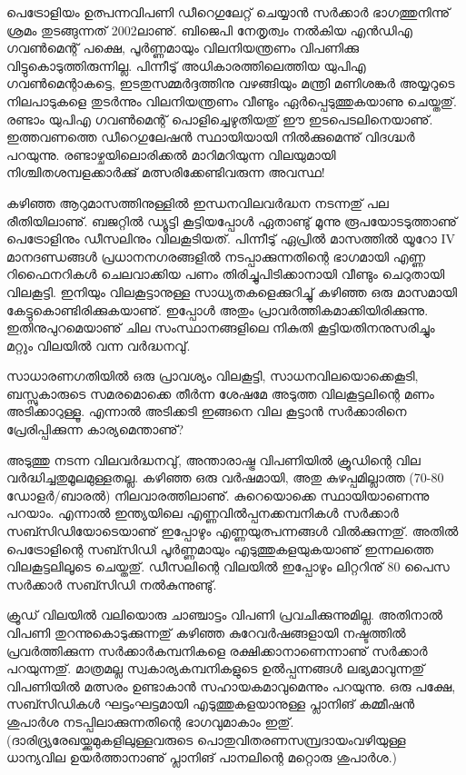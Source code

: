 ﻿
\vskip 2pt

\hspace*{2em}\parbox{8.5cm}{
\small
പെട്രോളിയം ഉത്പന്നവിപണി ഡീറെഗുലേറ്റ് ചെയ്യാന്‍ സര്‍ക്കാര്‍ ഭാഗത്തുനിന്നു് ശ്രമം തുടങ്ങുന്നത് 2002ലാണു്. 
ബിജെപി നേതൃത്വം നല്‍കിയ എന്‍ഡിഎ ഗവണ്‍മെന്റ് പക്ഷെ, പൂര്‍ണ്ണമായും വിലനിയന്ത്രണം വിപണിക്കു 
വിട്ടുകൊടുത്തിരുന്നില്ല. പിന്നീടു് അധികാരത്തിലെത്തിയ യുപിഎ ഗവണ്‍മെന്റാകട്ടെ, ഇടതുസമ്മര്‍ദ്ദത്തിനു വഴങ്ങിയും 
മന്ത്രി മണിശങ്കര്‍ അയ്യറുടെ നിലപാടുകളെ തുടര്‍ന്നും വിലനിയന്ത്രണം വീണ്ടും ഏര്‍പ്പെടുത്തുകയാണു ചെയ്തതു്. രണ്ടാം 
യുപിഎ ഗവണ്‍മെന്റ് പൊളിച്ചെഴുതിയതു് ഈ ഇടപെടലിനെയാണു്. ഇത്തവണത്തെ ഡീറെഗുലേഷന്‍ സ്ഥായിയായി
നില്‍ക്കുമെന്നു് വിദഗ്ദ്ധര്‍ പറയുന്നു. രണ്ടാഴ്ചയിലൊരിക്കല്‍ മാറിമറിയുന്ന വിലയുമായി നിശ്ചിതശമ്പളക്കാര്‍ക്കു് 
മത്സരിക്കേണ്ടിവരുന്ന അവസ്ഥ!
}

{\vskip 14pt}
\hspace*{-1.5em}കഴിഞ്ഞ ആറുമാസത്തിനുള്ളില്‍ ഇന്ധനവിലവര്‍ദ്ധന നടന്നതു് പല രീതിയിലാണു്. ബജറ്റില്‍ ഡ്യൂട്ടി കൂട്ടിയപ്പോള്‍ 
ഏതാണ്ടു് മൂന്നു രൂപയോടടുത്താണു് പെട്രോളിനും ഡീസലിനും വിലകൂടിയത്. പിന്നീടു് ഏപ്രില്‍ മാസത്തില്‍ യൂറോ IV 
മാനദണ്ഡങ്ങള്‍ പ്രധാനനഗരങ്ങളില്‍ നടപ്പാക്കുന്നതിന്റെ ഭാഗമായി എണ്ണ റിഫൈനറികള്‍ ചെലവാക്കിയ പണം 
തിരിച്ചുപിടിക്കാനായി വീണ്ടും ചെറുതായി വിലകൂട്ടി. ഇനിയും വിലകൂട്ടാനുള്ള സാധ്യതകളെക്കുറിച്ചു് കഴിഞ്ഞ ഒരു മാസമായി
കേട്ടുകൊണ്ടിരിക്കുകയാണു്. ഇപ്പോള്‍ അതും പ്രാവര്‍ത്തികമാക്കിയിരിക്കുന്നു. ഇതിനുപുറമെയാണു് ചില സംസ്ഥാനങ്ങളിലെ
നികുതി കൂട്ടിയതിനനുസരിച്ചും മറ്റും വിലയില്‍ വന്ന വര്‍ദ്ധനവു്.

സാധാരണഗതിയില്‍ ഒരു പ്രാവശ്യം വിലകൂട്ടി, സാധനവിലയൊക്കെകൂടി, ബസ്സുകാരുടെ സമരമൊക്കെ തീര്‍ന്ന 
ശേഷമേ അടുത്ത വിലകൂട്ടലിന്റെ മണം അടിക്കാറുള്ളൂ. എന്നാല്‍ അടിക്കടി ഇങ്ങനെ വില കൂട്ടാന്‍ സര്‍ക്കാരിനെ 
പ്രേരിപ്പിക്കുന്ന കാര്യമെന്താണു്?

അടുത്തു നടന്ന വിലവര്‍ദ്ധനവു്, അന്താരാഷ്ട്ര വിപണിയില്‍ ക്രൂഡിന്റെ വില വര്‍ദ്ധിച്ചതുമൂലമുള്ളതല്ല. കഴിഞ്ഞ ഒരു 
വര്‍ഷമായി, അതു കുഴപ്പമില്ലാത്ത (70-80 ഡോളര്‍/ബാരല്‍) നിലവാരത്തിലാണു്. കുറെയൊക്കെ സ്ഥായിയാണെന്നു
പറയാം. എന്നാല്‍ ഇന്ത്യയിലെ എണ്ണവില്‍പ്പനക്കമ്പനികള്‍ സര്‍ക്കാര്‍ സബ്സിഡിയോടെയാണു് ഇപ്പോഴും 
എണ്ണയുത്പന്നങ്ങള്‍ വില്‍ക്കുന്നതു്. അതില്‍ പെട്രോളിന്റെ സബ്സിഡി പൂര്‍ണ്ണമായും എടുത്തുകളയുകയാണു് 
ഇന്നലത്തെ വിലകൂട്ടലിലൂടെ ചെയ്തതു്. ഡീസലിന്റെ വിലയില്‍ ഇപ്പോഴും ലിറ്ററിനു് 80 പൈസ സര്‍ക്കാര്‍ 
സബ്സിഡി നല്‍കുന്നുണ്ടു്.

ക്രൂഡ് വിലയില്‍ വലിയൊരു ചാഞ്ചാട്ടം വിപണി പ്രവചിക്കുന്നുമില്ല. അതിനാല്‍ വിപണി തുറന്നുകൊടുക്കുന്നതു് 
കഴിഞ്ഞ കുറേവര്‍ഷങ്ങളായി നഷ്ടത്തില്‍ പ്രവര്‍ത്തിക്കുന്ന സര്‍ക്കാര്‍കമ്പനികളെ രക്ഷിക്കാനാണെന്നാണു് സര്‍ക്കാര്‍ 
പറയുന്നതു്. മാത്രമല്ല സ്വകാര്യകമ്പനികളുടെ ഉല്‍പ്പന്നങ്ങള്‍ ലഭ്യമാവുന്നതു് വിപണിയില്‍ മത്സരം ഉണ്ടാകാന്‍ 
സഹായകമാവുമെന്നും പറയുന്നു. ഒരു പക്ഷേ, സബ്സിഡികള്‍ ഘട്ടംഘട്ടമായി എടുത്തുകളയാനുള്ള പ്ലാനിങ് 
കമ്മീഷന്‍ ശുപാര്‍ശ നടപ്പിലാക്കുന്നതിന്റെ ഭാഗവുമാകാം ഇതു്. (ദാരിദ്ര്യരേഖയ്ക്കുമുകളിലുള്ളവരുടെ പൊതുവിതരണസമ്പ്രദായംവഴിയുള്ള ധാന്യവില ഉയര്‍ത്താനാണു് പ്ലാനിങ് പാനലിന്റെ മറ്റൊരു ശുപാര്‍ശ.)

